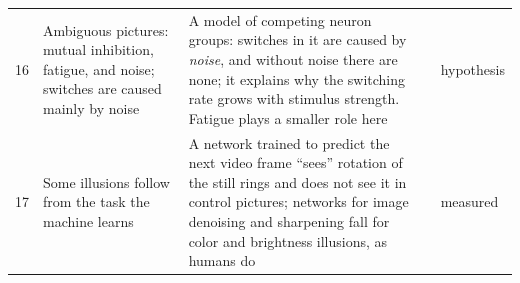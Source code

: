 {\begin{longtable}{>{\raggedright}p{0.5cm}>{\raggedright}p{4.0cm}>{\raggedright}p{5.6cm}>{\raggedright}p{2.3cm}>{\raggedright\arraybackslash}p{1.7cm}}
16 & Ambiguous pictures: mutual inhibition, fatigue, and noise; switches are caused mainly by noise & A model of competing neuron groups: switches in it are caused by \emph{noise}, and without noise there are none; it explains why the switching rate grows with stimulus strength. Fatigue plays a smaller role here & \cite{MorenoBote2007} & hypothesis \\
17 & Some illusions follow from the task the machine learns & A network trained to predict the next video frame ``sees'' rotation of the still rings and does not see it in control pictures; networks for image denoising and sharpening fall for color and brightness illusions, as humans do & \cite{Watanabe2018,GomezVilla2020} & measured \\
\bottomrule
\end{longtable}}
